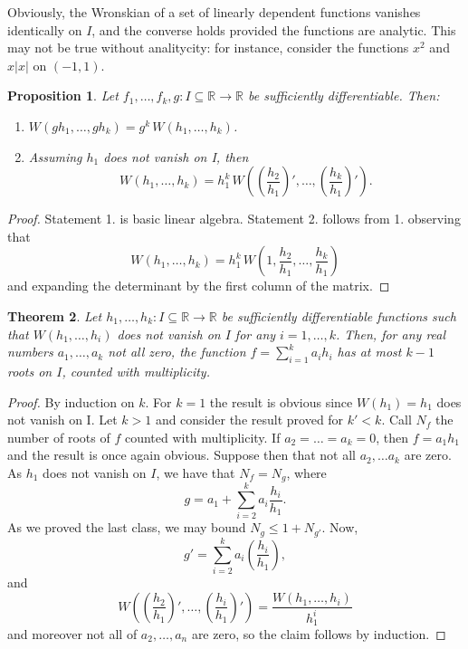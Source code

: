 \documentclass[11pt, a4paper]{article}
\newcommand{\RR}{\mathbb{R}}
\theoremstyle{plain}
\newtheorem{prop}{Proposition}[section]
\newtheorem{thm}[prop]{Theorem}
\theoremstyle{definition}
\begin{document}
Obviously, the Wronskian of a set of linearly dependent functions vanishes identically on $I$, and the converse holds provided the functions are analytic. This may not be true without analitycity: for instance, consider the functions $x^2$ and $x|x|$ on $(-1,1)$.

\begin{prop} Let $f_1,\dots, f_k,g:I\subseteq\RR\to\RR$ be sufficiently differentiable. Then:
\begin{enumerate}
\item $W(gh_1,\dots,gh_k)=g^k\, W(h_1,\dots, h_k)$.
\item Assuming $h_1$ does not vanish on I, then
\[W(h_1,\dots,h_k)=h_1^k \,W\left(\left(\frac{h_2}{h_1}\right)',\dots, \left(\frac{h_k}{h_1}\right)'\right).\]
\end{enumerate}
\end{prop}
\begin{proof} Statement 1. is basic linear algebra. Statement 2. follows from 1. observing that
\[W(h_1,\dots,h_k)=h_1^k \,W\left(1, \frac{h_2}{h_1},\dots, \frac{h_k}{h_1}\right)\]
and expanding the determinant by the first column of the matrix.
\end{proof}

\begin{thm} Let $h_1,\dots,h_k:I\subseteq\RR\to\RR$ be sufficiently differentiable functions such that $W(h_1,\dots,h_i)$ does not vanish on $I$ for any $i=1,\dots,k$. Then, for any real numbers $a_1,\dots,a_k$ not all zero, the function $f=\sum_{i=1}^k a_ih_i$ has at most $k-1$ roots on $I$, counted with multiplicity.
\end{thm}
\begin{proof} By induction on $k$. For $k=1$ the result is obvious since $W(h_1)=h_1$ does not vanish on I.
Let $k>1$ and consider the result proved for $k'<k$. Call $N_f$ the number of roots of $f$ counted with multiplicity. If $a_2=\dots=a_k=0$, then $f=a_1h_1$ and the result is once again obvious. Suppose then that not all $a_2,\dots a_k$ are zero. As $h_1$ does not vanish on $I$, we have that $N_f=N_g$, where
\[g=a_1+\sum_{i=2}^k a_i \frac{h_i}{h_1}.\]
As we proved the last class, we may bound $N_g\leq 1+ N_{g'}$. Now, 
\[g'=\sum_{i=2}^k a_i \left(\frac{h_i}{h_1}\right),\]
and 
\[W\left(\left(\frac{h_2}{h_1}\right)',\dots, \left(\frac{h_i}{h_1}\right)'\right) = \frac{W(h_1,\dots,h_i)}{h_1^i} \]
and moreover not all of $a_2,\dots, a_n$ are zero, so the claim follows by induction.
\end{proof}
\end{document}
